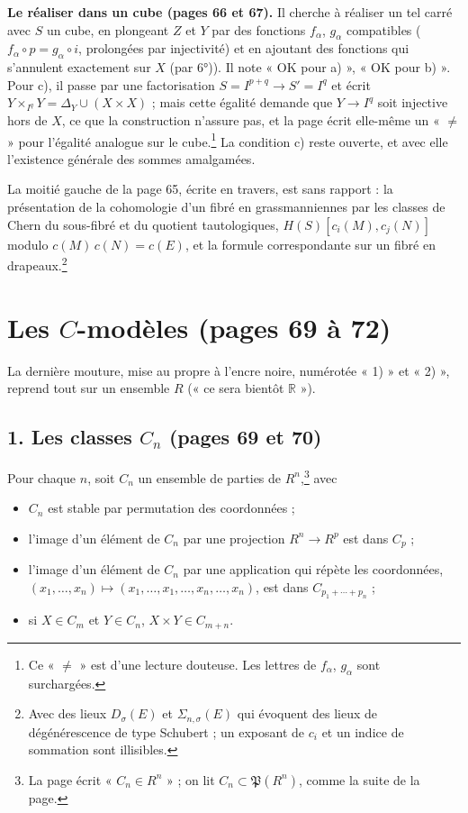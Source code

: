 \documentclass[11pt,a4paper]{article}
\begin{document}
\textbf{Le réaliser dans un cube (pages 66 et 67).} Il cherche à réaliser un tel
carré avec $S$ un cube, en plongeant $Z$ et $Y$ par des fonctions $f_\alpha$,
$g_\alpha$ compatibles ($f_\alpha \circ p = g_\alpha \circ i$, prolongées par
injectivité) et en ajoutant des fonctions qui s'annulent exactement sur $X$
(par 6°)). Il note « OK pour a) », « OK pour b) ». Pour c), il passe par une
factorisation $S = I^{p+q} \to S' = I^q$ et écrit $Y \times_{I^q} Y = \Delta_Y
\cup (X \times X)$ ; mais cette égalité demande que $Y \to I^q$ soit injective
hors de $X$, ce que la construction n'assure pas, et la page écrit elle-même
un « $\neq$ » pour l'égalité analogue sur le cube.\footnote{Ce « $\neq$ » est
d'une lecture douteuse. Les lettres de $f_\alpha$, $g_\alpha$ sont
surchargées.} La condition c) reste ouverte, et avec elle l'existence générale
des sommes amalgamées.

La moitié gauche de la page 65, écrite en travers, est sans rapport : la
présentation de la cohomologie d'un fibré en grassmanniennes par les classes de
Chern du sous-fibré et du quotient tautologiques, $H(S)[c_i(M), c_j(N)]$ modulo
$c(M)\,c(N) = c(E)$, et la formule correspondante sur un fibré en
drapeaux.\footnote{Avec des lieux $D_\sigma(E)$ et $\Sigma_{n,\sigma}(E)$ qui
évoquent des lieux de dégénérescence de type Schubert ; un exposant de $c_i$ et
un indice de sommation sont illisibles.}

\section*{Les $C$-modèles (pages 69 à 72)}

La dernière mouture, mise au propre à l'encre noire, numérotée « 1) » et
« 2) », reprend tout sur un ensemble $R$ (« ce sera bientôt $\mathbb{R}$ »).

\subsection*{1. Les classes $C_n$ (pages 69 et 70)}

Pour chaque $n$, soit $C_n$ un ensemble de parties de $R^n$,\footnote{La page
écrit « $C_n \in R^n$ » ; on lit $C_n \subset \mathfrak{P}(R^n)$, comme la
suite de la page.} avec

\begin{itemize}
\item[(1)] $C_n$ est stable par permutation des coordonnées ;
\item[(2)] l'image d'un élément de $C_n$ par une projection $R^n \to R^p$ est
  dans $C_p$ ;
\item[(3)] l'image d'un élément de $C_n$ par une application qui répète les
  coordonnées, $(x_1, \dots, x_n) \mapsto (x_1, \dots, x_1, \dots, x_n, \dots,
  x_n)$, est dans $C_{p_1 + \cdots + p_n}$ ;
\item[(4)] si $X \in C_m$ et $Y \in C_n$, $X \times Y \in C_{m+n}$.
\end{itemize}
\end{document}
